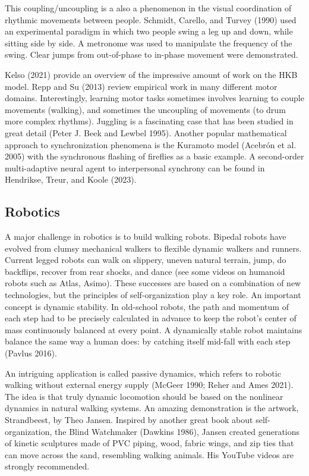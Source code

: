 \documentclass[
  a4paper,
  DIV=11,
  numbers=noendperiod,
  oneside]{scrreprt}
\begin{document}
This coupling/uncoupling is a also a phenomenon in the visual
coordination of rhythmic movements between people. Schmidt, Carello, and
Turvey (1990) used an experimental paradigm in which two people swing a
leg up and down, while sitting side by side. A metronome was used to
manipulate the frequency of the swing. Clear jumps from out-of-phase to
in-phase movement were demonstrated.

Kelso (2021) provide an overview of the impressive amount of work on the
HKB model. Repp and Su (2013) review empirical work in many different
motor domains. Interestingly, learning motor tasks sometimes involves
learning to couple movements (walking), and sometimes the uncoupling of
movements (to drum more complex rhythms). Juggling is a fascinating case
that has been studied in great detail (Peter J. Beek and Lewbel 1995).
Another popular mathematical approach to synchronization phenomena is
the Kuramoto model (Acebrón et al. 2005) with the synchronous flashing
of fireflies as a basic example. A second-order multi-adaptive neural
agent to interpersonal synchrony can be found in Hendrikse, Treur, and
Koole (2023).

\hypertarget{sec-Robotics}{%
\subsection{Robotics}\label{sec-Robotics}}

A major challenge in robotics is to build walking robots. Bipedal robots
have evolved from clumsy mechanical walkers to flexible dynamic walkers
and runners. Current legged robots can walk on slippery, uneven natural
terrain, jump, do backflips, recover from rear shocks, and dance (see
some videos on humanoid robots such as Atlas, Asimo). These successes
are based on a combination of new technologies, but the principles of
self-organization play a key role. An important concept is dynamic
stability. In old-school robots, the path and momentum of each step had
to be precisely calculated in advance to keep the robot's center of mass
continuously balanced at every point. A dynamically stable robot
maintains balance the same way a human does: by catching itself mid-fall
with each step (Pavlus 2016).

An intriguing application is called passive dynamics, which refers to
robotic walking without external energy supply (McGeer 1990; Reher and
Ames 2021). The idea is that truly dynamic locomotion should be based on
the nonlinear dynamics in natural walking systems. An amazing
demonstration is the artwork, Strandbeest, by Theo Jansen. Inspired by
another great book about self-organization, the Blind Watchmaker
(Dawkins 1986), Jansen created generations of kinetic sculptures made of
PVC piping, wood, fabric wings, and zip ties that can move across the
sand, resembling walking animals. His YouTube videos are strongly
recommended.
\end{document}

